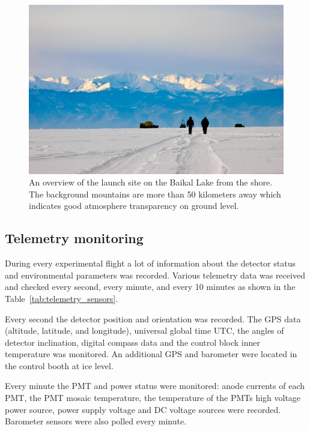 \documentclass[universe,article,submit,moreauthors,pdftex]{Definitions/mdpi}
\begin{document}
\begin{figure}[tb]
\begin{minipage}[t]{0.58\textwidth}
       \centering
       \includegraphics[width=\textwidth]{DSC_7423.jpg}\hspace{2pc}%
        \caption{An overview of the launch site on the Baikal Lake from the shore. The background mountains are more than 50 kilometers away which indicates good atmosphere transparency on ground level.}
        \label{fig:baikal_atmo}
   \end{minipage}
\end{figure}


\subsection{Telemetry monitoring\label{sect:telemetry}}

During every experimental flight a lot of information about the detector status and environmental parameters was recorded. Various telemetry data was received and checked every second, every minute, and every 10 minutes as shown in the Table~\ref{tab:telemetry_sensors}.

Every second the detector position and orientation was recorded. The GPS data (altitude, latitude, and longitude), universal global time UTC, the angles of detector inclination, digital compass data and the control block inner temperature was monitored. An additional GPS and barometer were located in the control booth at ice level.

Every minute the PMT and power status were monitored: anode currents of each PMT, the PMT mosaic temperature, the temperature of the PMTs high voltage power source, power supply voltage and DC voltage sources were recorded. Barometer sensors were also polled every minute.
\end{document}
